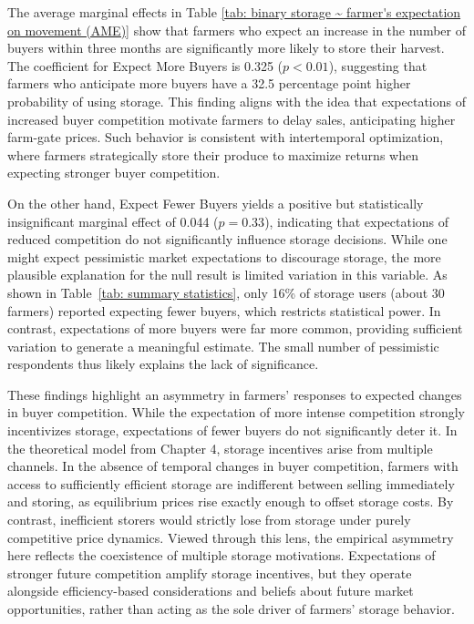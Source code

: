 


The average marginal effects in Table \ref{tab: binary storage ~ farmer's expectation on movement (AME)} show that farmers who expect an increase in the number of buyers within three months are significantly more likely to store their harvest. The coefficient for \textsf{Expect More Buyers} is 0.325 ($p < 0.01$), suggesting that farmers who anticipate more buyers have a 32.5 percentage point higher probability of using storage. This finding aligns with the idea that expectations of increased buyer competition motivate farmers to delay sales, anticipating higher farm-gate prices. Such behavior is consistent with intertemporal optimization, where farmers strategically store their produce to maximize returns when expecting stronger buyer competition.  

On the other hand, \textsf{Expect Fewer Buyers} yields a positive but statistically insignificant marginal effect of 0.044 ($p = 0.33$), indicating that expectations of reduced competition do not significantly influence storage decisions. While one might expect pessimistic market expectations to discourage storage, the more plausible explanation for the null result is limited variation in this variable. As shown in Table~\ref{tab: summary statistics}, only 16\% of storage users (about 30 farmers) reported expecting fewer buyers, which restricts statistical power. In contrast, expectations of more buyers were far more common, providing sufficient variation to generate a meaningful estimate. The small number of pessimistic respondents thus likely explains the lack of significance.

These findings highlight an asymmetry in farmers' responses to expected changes in buyer competition. While the expectation of more intense competition strongly incentivizes storage, expectations of fewer buyers do not significantly deter it. In the theoretical model from Chapter 4, storage incentives arise from multiple channels. In the absence of temporal changes in buyer competition, farmers with access to sufficiently efficient storage are indifferent between selling immediately and storing, as equilibrium prices rise exactly enough to offset storage costs. By contrast, inefficient storers would strictly lose from storage under purely competitive price dynamics. Viewed through this lens, the empirical asymmetry here reflects the coexistence of multiple storage motivations. Expectations of stronger future competition amplify storage incentives, but they operate alongside efficiency-based considerations and beliefs about future market opportunities, rather than acting as the sole driver of farmers’ storage behavior.

